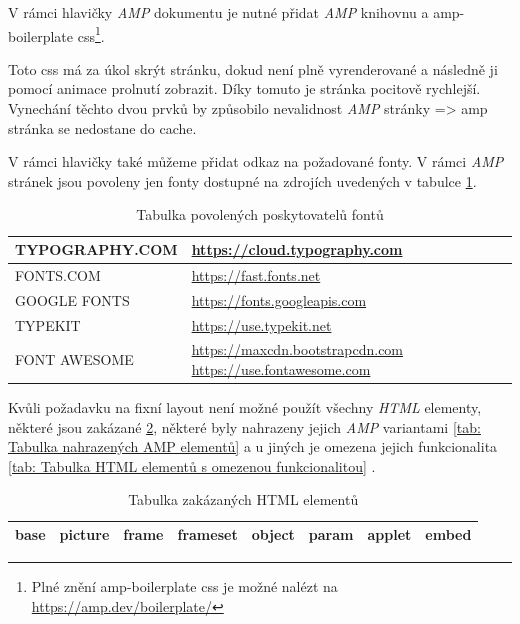 V rámci hlavičky \emph{AMP} dokumentu je nutné přidat \emph{AMP} knihovnu a amp-boilerplate css\footnote{Plné znění amp-boilerplate css je možné nalézt na \url{https://amp.dev/boilerplate/}}\cite{AMPBoilerplate}.

Toto css má za úkol skrýt stránku, dokud není plně vyrenderované a následně ji pomocí animace prolnutí zobrazit. Díky tomuto je stránka pocitově rychlejší.
Vynechání těchto dvou prvků by způsobilo nevalidnost \emph{AMP} stránky => amp stránka se nedostane do cache.

V rámci hlavičky také můžeme přidat odkaz na požadované fonty. V rámci \emph{AMP} stránek jsou povoleny jen fonty dostupné na zdrojích uvedených v tabulce \ref{tab:Tabulka povolených zdrojů fontů}\cite{ampCustomFonts}.

\begin{table}[H]
	\caption{Tabulka povolených poskytovatelů fontů}
	\centering
	\begin{tabular}{m{10em} | m{20em}}
		\toprule
		\cmidrule(r){1-2}
		TYPOGRAPHY.COM & \url{https://cloud.typography.com} \\ \midrule
		FONTS.COM & \url{https://fast.fonts.net} \\ \midrule
		GOOGLE FONTS & \url{https://fonts.googleapis.com} \\ \midrule
		TYPEKIT & \url{https://use.typekit.net} \\ \midrule
		FONT AWESOME & \url{https://maxcdn.bootstrapcdn.com} \newline \url{https://use.fontawesome.com} \\
		\bottomrule
	\end{tabular}
	\label{tab:Tabulka povolených zdrojů fontů}
\end{table}

Kvůli požadavku na fixní layout není možné použít všechny \emph{HTML} elementy, některé jsou zakázané \ref{tab: Tabulka zakázaných HTML elementů}, některé byly nahrazeny jejich \emph{AMP} variantami \ref{tab: Tabulka nahrazených AMP elementů} a u jiných je omezena jejich funkcionalita \ref{tab: Tabulka HTML elementů s omezenou funkcionalitou} \cite[p.\ 41]{AMP-ENG-Book}.

\begin{table}[H]
	\caption{Tabulka zakázaných HTML elementů} 
	\centering
	\begin{tabular}{c|c|c|c|c|c|c|c}
		\toprule
		base & picture & frame & frameset & object & param & applet & embed \\
		\bottomrule
	\end{tabular}
	\label{tab: Tabulka zakázaných HTML elementů}
\end{table}

